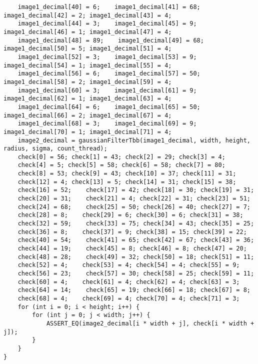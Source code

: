 \documentclass{report}
\begin{document}
\begin{lstlisting}
    image1_decimal[40] = 6;    image1_decimal[41] = 68; image1_decimal[42] = 2; image1_decimal[43] = 4;
    image1_decimal[44] = 3;    image1_decimal[45] = 9; image1_decimal[46] = 1; image1_decimal[47] = 4;
    image1_decimal[48] = 89;    image1_decimal[49] = 68; image1_decimal[50] = 5; image1_decimal[51] = 4;
    image1_decimal[52] = 3;    image1_decimal[53] = 9; image1_decimal[54] = 1; image1_decimal[55] = 4;
    image1_decimal[56] = 6;    image1_decimal[57] = 50; image1_decimal[58] = 2; image1_decimal[59] = 4;
    image1_decimal[60] = 3;    image1_decimal[61] = 9; image1_decimal[62] = 1; image1_decimal[63] = 4;
    image1_decimal[64] = 6;    image1_decimal[65] = 50; image1_decimal[66] = 2; image1_decimal[67] = 4;
    image1_decimal[68] = 3;    image1_decimal[69] = 9; image1_decimal[70] = 1; image1_decimal[71] = 4;
    image2_decimal = gaussianFilterTbb(image1_decimal, width, height, radius, sigma, count_thread);
    check[0] = 56; check[1] = 43; check[2] = 29; check[3] = 4;
    check[4] = 5; check[5] = 58; check[6] = 58; check[7] = 80;
    check[8] = 53; check[9] = 43; check[10] = 37; check[11] = 31;
    check[12] = 4; check[13] = 5; check[14] = 31; check[15] = 38;
    check[16] = 52;    check[17] = 42; check[18] = 30; check[19] = 31;
    check[20] = 31;    check[21] = 4; check[22] = 31; check[23] = 51;
    check[24] = 68;    check[25] = 50; check[26] = 40; check[27] = 7;
    check[28] = 8;    check[29] = 6; check[30] = 6; check[31] = 38;
    check[32] = 59;    check[33] = 75; check[34] = 43; check[35] = 25;
    check[36] = 8;    check[37] = 9; check[38] = 15; check[39] = 22;
    check[40] = 54;    check[41] = 65; check[42] = 67; check[43] = 36;
    check[44] = 19;    check[45] = 8; check[46] = 8; check[47] = 20;
    check[48] = 28;    check[49] = 32; check[50] = 18; check[51] = 11;
    check[52] = 4;    check[53] = 4; check[54] = 4; check[55] = 9;
    check[56] = 23;    check[57] = 30; check[58] = 25; check[59] = 11;
    check[60] = 4;    check[61] = 4; check[62] = 4; check[63] = 3;
    check[64] = 14;    check[65] = 19; check[66] = 18; check[67] = 8;
    check[68] = 4;    check[69] = 4; check[70] = 4; check[71] = 3;
    for (int i = 0; i < height; i++) {
        for (int j = 0; j < width; j++) {
            ASSERT_EQ(image2_decimal[i * width + j], check[i * width + j]);
        }
    }
}


\end{lstlisting}
\end{document}
